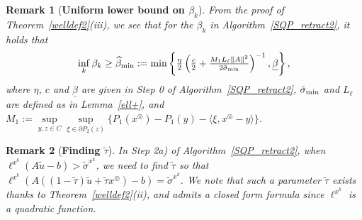 \documentclass[10pt]{article}
\numberwithin{equation}{section}
\newtheorem{remark}{Remark}[section]
\def\sigmamin{{\rm\tilde{\sigma}_{min}}}
\def\xfeasss{x^\circledcirc}
\begin{document}
\begin{remark}[{{\bf Uniform lower bound on $\beta_k$}}]\label{gamma2}
From the proof of Theorem~\ref{welldef2}(iii), we see that for the $\beta_k$ in Algorithm~\ref{SQP_retract2}, it holds that
\[
\inf_k \beta_k \ge \widehat{\beta}_{\rm min}:= \textstyle\min\left\{\frac{\eta}{2}\left(\frac{c}2 + {\frac{M_1L_{\ell}\|A\|^2}{2\sigmamin}} \right)^{-1},\underline{\beta}\right\},
\]
where $\eta$, $c$ and $\underline{\beta}$ are given in Step 0 of Algorithm~\ref{SQP_retract2}, $\sigmamin$ and $L_\ell$ are defined as in Lemma~\ref{ell+}, and $M_1:= \sup\limits_{y,z\in C}\sup\limits_{\xi\in\partial P_2(z)}\{P_1(\xfeasss) - P_1(y) - \langle\xi, \xfeasss - y\rangle\}$.
\end{remark}

\begin{remark}[{{\bf Finding $\widetilde\tau$}}]
In Step 2a) of Algorithm~\ref{SQP_retract2}, when $\ell^{x^k}(A\widetilde u - b) > \tilde{\sigma}^{x^k}$, we need to find $\widetilde\tau$ so that $\ell^{x^k}(A((1-\widetilde\tau)\widetilde u + \widetilde\tau \xfeasss) - b) = \tilde{\sigma}^{x^k}$. We note that such a parameter $\widetilde\tau$ exists thanks to Theorem~\ref{welldef2}(ii), and admits a closed form formula since $\ell^{x^k}$ is a quadratic function.
\end{remark}
\end{document}
